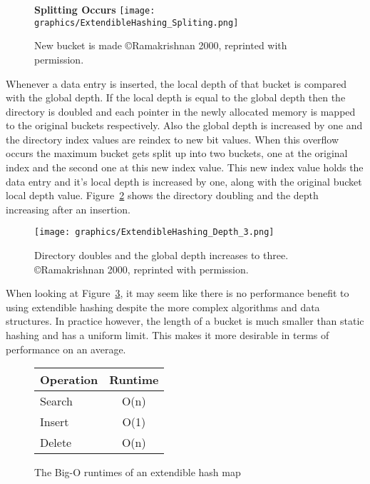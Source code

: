 \documentclass[letterpaper, 12pt]{article}
\begin{document}
\begin{figure}[H]
  \centering
  \textbf{Splitting Occurs}
  \texttt{[image: graphics/ExtendibleHashing\_Spliting.png]}
  \caption{New bucket is made \copyright Ramakrishnan 2000, reprinted with permission.\cite{ramakrishnan2000database}}
  \label{fig:ext_hash_split}
\end{figure}

Whenever a data entry is inserted, the local depth of that bucket is compared with the global depth. If the local depth
is equal to the global depth then the directory is doubled and each pointer in the newly allocated memory is mapped to the
original buckets respectively. Also the global depth is increased by one and the directory index values are reindex to new
bit values. When this overflow occurs the maximum bucket gets split up into two buckets, one at the original index and the
second one at this new index value. This new index value holds the data entry and it's local depth is increased by one, along with
the original bucket local depth value. Figure~\ref{fig:ext_hash_dir_dbl} shows the directory doubling and the depth increasing
after an insertion.
\par\vspace{\baselineskip}

\begin{figure}
  \centering
  \texttt{[image: graphics/ExtendibleHashing\_Depth\_3.png]}
  \caption{Directory doubles and the global depth increases to three. \copyright Ramakrishnan 2000, reprinted with permission.\cite{ramakrishnan2000database}}
  \label{fig:ext_hash_dir_dbl}
\end{figure}

When looking at Figure~\ref{fig:ext_hash_runtimes}, it may seem like there is no performance 
benefit to using extendible hashing despite the more complex algorithms and data structures. 
In practice however, the length of a bucket is much smaller than static hashing and has
a uniform limit. This makes it more desirable in terms of performance on an average.
\par\vspace{\baselineskip}

\begin{figure}[H]
\centering
\begin{tabular}{l | c }
  \hline
  Operation & Runtime \\ \hline \hline
  Search & O(n) \\ \hline
  Insert & O(1) \\ \hline
  Delete & O(n) \\ \hline
\end{tabular}
\caption{The Big-O runtimes of an extendible hash map}
\label{fig:ext_hash_runtimes}
\end{figure}
\end{document}
